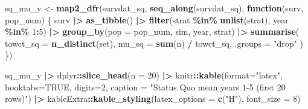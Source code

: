 \documentclass[
]{article}
\newenvironment{Shaded}{\begin{snugshade}}{\end{snugshade}}
\newcommand{\AttributeTok}[1]{\textcolor[rgb]{0.13,0.29,0.53}{#1}}
\newcommand{\ConstantTok}[1]{\textcolor[rgb]{0.56,0.35,0.01}{#1}}
\newcommand{\ControlFlowTok}[1]{\textcolor[rgb]{0.13,0.29,0.53}{\textbf{#1}}}
\newcommand{\DecValTok}[1]{\textcolor[rgb]{0.00,0.00,0.81}{#1}}
\newcommand{\FunctionTok}[1]{\textcolor[rgb]{0.13,0.29,0.53}{\textbf{#1}}}
\newcommand{\NormalTok}[1]{#1}
\newcommand{\OtherTok}[1]{\textcolor[rgb]{0.56,0.35,0.01}{#1}}
\newcommand{\SpecialCharTok}[1]{\textcolor[rgb]{0.81,0.36,0.00}{\textbf{#1}}}
\newcommand{\StringTok}[1]{\textcolor[rgb]{0.31,0.60,0.02}{#1}}
\begin{document}
\begin{Shaded}
\begin{Highlighting}[]
\NormalTok{sq\_mu\_y }\OtherTok{\textless{}{-}} \FunctionTok{map2\_dfr}\NormalTok{(survdat\_sq, }\FunctionTok{seq\_along}\NormalTok{(survdat\_sq), }\ControlFlowTok{function}\NormalTok{(surv, pop\_num) \{}
\NormalTok{  surv }\SpecialCharTok{|\textgreater{}}
    \FunctionTok{as\_tibble}\NormalTok{() }\SpecialCharTok{|\textgreater{}}
    \FunctionTok{filter}\NormalTok{(strat }\SpecialCharTok{\%in\%} \FunctionTok{unlist}\NormalTok{(strat), year }\SpecialCharTok{\%in\%} \DecValTok{1}\SpecialCharTok{:}\DecValTok{5}\NormalTok{) }\SpecialCharTok{|\textgreater{}}
    \FunctionTok{group\_by}\NormalTok{(}\AttributeTok{pop =}\NormalTok{ pop\_num, sim, year, strat) }\SpecialCharTok{|\textgreater{}}
    \FunctionTok{summarise}\NormalTok{(}
      \AttributeTok{towct\_sq =} \FunctionTok{n\_distinct}\NormalTok{(set),}
      \AttributeTok{mu\_sq =} \FunctionTok{sum}\NormalTok{(n) }\SpecialCharTok{/}\NormalTok{ towct\_sq,}
      \AttributeTok{.groups =} \StringTok{"drop"}
\NormalTok{    )}
\NormalTok{\})}

\NormalTok{sq\_mu\_y }\SpecialCharTok{|\textgreater{}} 
\NormalTok{   dplyr}\SpecialCharTok{::}\FunctionTok{slice\_head}\NormalTok{(}\AttributeTok{n =} \DecValTok{20}\NormalTok{) }\SpecialCharTok{|\textgreater{}}
\NormalTok{  knitr}\SpecialCharTok{::}\FunctionTok{kable}\NormalTok{(}\AttributeTok{format=}\StringTok{"latex"}\NormalTok{, }\AttributeTok{booktabs=}\ConstantTok{TRUE}\NormalTok{, }\AttributeTok{digits=}\DecValTok{2}\NormalTok{,}
              \AttributeTok{caption =} \StringTok{"Status Quo mean years 1{-}5 (first 20 rows)"}\NormalTok{) }\SpecialCharTok{|\textgreater{}}
\NormalTok{  kableExtra}\SpecialCharTok{::}\FunctionTok{kable\_styling}\NormalTok{(}\AttributeTok{latex\_options =} \FunctionTok{c}\NormalTok{(}\StringTok{"H"}\NormalTok{), }\AttributeTok{font\_size =} \DecValTok{8}\NormalTok{)}
\end{Highlighting}
\end{Shaded}
\end{document}
